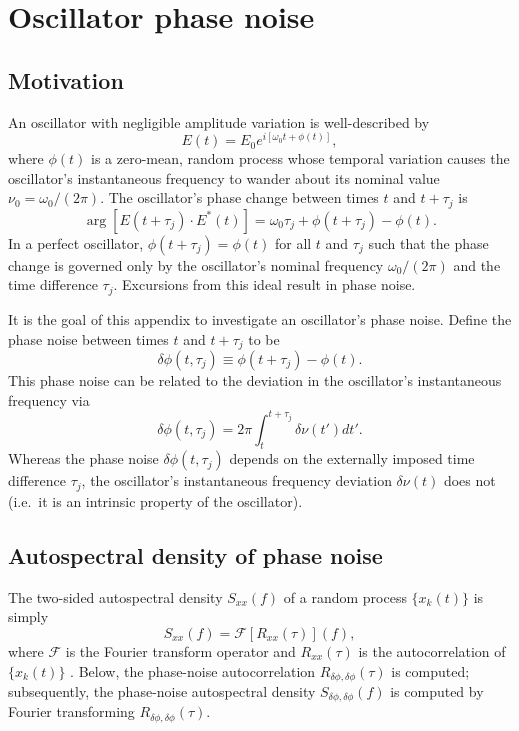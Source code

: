 \chapter{Oscillator phase noise}


\section{Motivation}
An oscillator with negligible amplitude variation is well-described by
\begin{equation}
  E(t) = E_0 e^{i [\omega_0 t + \phi(t)]},
\end{equation}
where $\phi(t)$ is a zero-mean, random process
whose temporal variation causes
the oscillator's instantaneous frequency
to wander about its nominal value $\nu_0 = \omega_0 / (2 \pi)$.
The oscillator's phase change between
times $t$ and $t + \tau_j$ is
\begin{equation}
  \arg[E(t + \tau_j) \cdot E^*(t)]
  =
  \omega_0 \tau_j + \phi(t + \tau_j) - \phi(t).
\end{equation}
In a perfect oscillator,
$\phi(t + \tau_j) = \phi(t)$ for all $t$ and $\tau_j$
such that the phase change is governed only by
the oscillator's nominal frequency $\omega_0 / (2 \pi)$ and
the time difference $\tau_j$.
Excursions from this ideal result in phase noise.

It is the goal of this appendix
to investigate an oscillator's phase noise.
Define the phase noise between times $t$ and $t + \tau_j$ to be
\begin{equation}
  \delta \phi(t, \tau_j)
  \equiv
  \phi(t + \tau_j) - \phi(t).
\end{equation}
This phase noise can be related to
the deviation in the oscillator's instantaneous frequency via
\begin{equation}
  \delta \phi(t, \tau_j)
  =
  2 \pi \int_{t}^{t + \tau_j} \delta \nu(t') dt'.
\end{equation}
Whereas the phase noise $\delta \phi(t, \tau_j)$
depends on the externally imposed time difference $\tau_j$,
the oscillator's instantaneous frequency deviation $\delta \nu(t)$ does not
(i.e.\ it is an intrinsic property of the oscillator).


\section{Autospectral density of phase noise}
The two-sided autospectral density $S_{xx}(f)$
of a random process $\{x_k(t)\}$ is simply
\begin{equation}
  S_{xx}(f) = \mathcal{F}[R_{xx}(\tau)](f),
\end{equation}
where $\mathcal{F}$ is the Fourier transform operator and
$R_{xx}(\tau)$ is the autocorrelation of $\{x_k(t)\}$
\cite{bendat_and_piersol}.
Below, the phase-noise autocorrelation
$R_{\delta\phi,\delta\phi}(\tau)$ is computed;
subsequently, the phase-noise autospectral density
$S_{\delta\phi,\delta\phi}(f)$ is computed
by Fourier transforming
$R_{\delta\phi,\delta\phi}(\tau)$.


